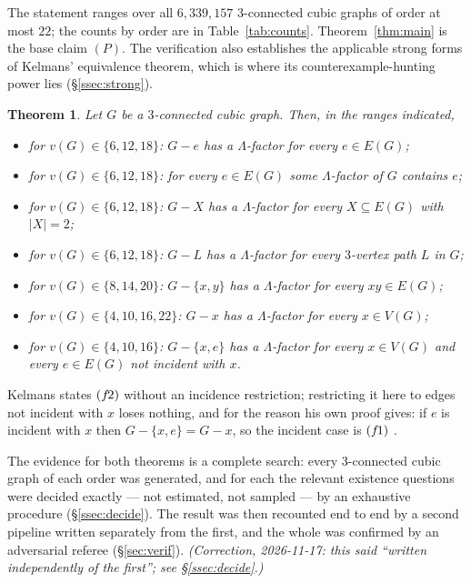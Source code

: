 \documentclass[11pt]{amsart}
\newcommand{\Lam}{\Lambda}
\newcommand{\vv}{v}
\theoremstyle{plain}
\newtheorem{theorem}{Theorem}[section]
\theoremstyle{definition}
\theoremstyle{remark}
\begin{document}
\noindent The statement ranges over all $6{,}339{,}157$ $3$-connected
cubic graphs of order at most $22$; the counts by order are in
Table~\ref{tab:counts}. Theorem~\ref{thm:main} is the base claim $(P)$.
The verification also establishes the applicable strong forms of Kelmans'
equivalence theorem, which is where its counterexample-hunting power lies
(\S\ref{ssec:strong}).

\begin{theorem}\label{thm:strong}
Let $G$ be a $3$-connected cubic graph. Then, in the ranges indicated,
\begin{itemize}
\item[$(z2)$] for $\vv(G)\in\{6,12,18\}$: $G-e$ has a $\Lam$-factor for
  every $e\in E(G)$;
\item[$(z3)$] for $\vv(G)\in\{6,12,18\}$: for every $e\in E(G)$ some
  $\Lam$-factor of $G$ contains $e$;
\item[$(z7)$] for $\vv(G)\in\{6,12,18\}$: $G-X$ has a $\Lam$-factor for
  every $X\subseteq E(G)$ with $|X|=2$;
\item[$(z8)$] for $\vv(G)\in\{6,12,18\}$: $G-L$ has a $\Lam$-factor for
  every $3$-vertex path $L$ in $G$;
\item[$(t2)$] for $\vv(G)\in\{8,14,20\}$: $G-\{x,y\}$ has a $\Lam$-factor
  for every $xy\in E(G)$;
\item[$(f\mkern-2mu1)$] for $\vv(G)\in\{4,10,16,22\}$: $G-x$ has a $\Lam$-factor
  for every $x\in V(G)$;
\item[$(f\mkern-2mu2)$] for $\vv(G)\in\{4,10,16\}$: $G-\{x,e\}$ has a $\Lam$-factor
  for every $x\in V(G)$ and every $e\in E(G)$ not incident with $x$.
\end{itemize}
\end{theorem}

\noindent Kelmans states $(f\mkern-2mu2)$ without an incidence
restriction; restricting it here to edges not incident with $x$ loses
nothing, and for the reason his own proof gives: if $e$ is incident with
$x$ then $G-\{x,e\}=G-x$, so the incident case is $(f\mkern-2mu1)$
\cite[3.21]{Kel11}.

The evidence for both theorems is a complete search: every $3$-connected
cubic graph of each order was generated, and for each the relevant
existence questions were decided exactly --- not estimated, not sampled
--- by an exhaustive procedure (\S\ref{ssec:decide}). The result was then
recounted end to end by a second pipeline written separately from the
first, and the whole was confirmed by an adversarial referee
(\S\ref{sec:verif}). \emph{(Correction, 2026-11-17: this said ``written
independently of the first''; see \S\ref{ssec:decide}.)}
\end{document}
